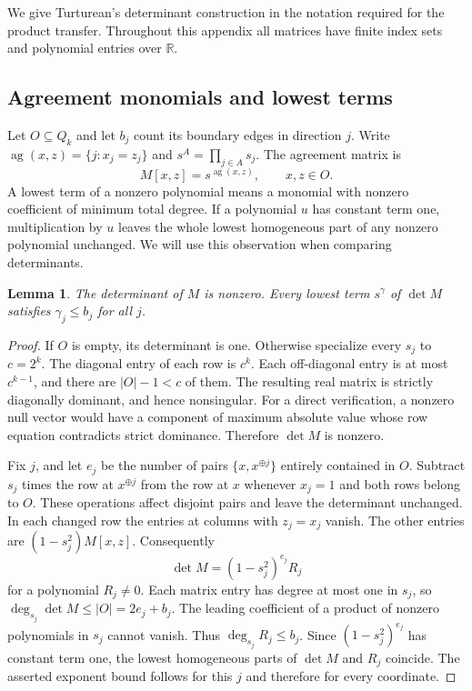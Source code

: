 \documentclass[11pt,reqno]{amsart}
\newtheorem{lemma}[theorem]{Lemma}
\theoremstyle{definition}
\theoremstyle{remark}
\newcommand{\R}{\mathbb R}
\newcommand{\ag}{\operatorname{ag}}
\numberwithin{equation}{section}
\begin{document}
We give Turturean's determinant construction in the notation required
for the product transfer. Throughout this appendix all matrices have
finite index sets and polynomial entries over $\R$.

\subsection{Agreement monomials and lowest terms}

Let $O\subseteq Q_k$ and let $b_j$ count its boundary edges in direction
$j$. Write $\ag(x,z)=\{j:x_j=z_j\}$ and
$s^A=\prod_{j\in A}s_j$. The agreement matrix is
\[
 M[x,z]=s^{\ag(x,z)},\qquad x,z\in O.
\]
A lowest term of a nonzero polynomial means a monomial with nonzero
coefficient of minimum total degree. If a polynomial $u$ has constant
term one, multiplication by $u$ leaves the whole lowest homogeneous
part of any nonzero polynomial unchanged. We will use this observation
when comparing determinants.

\begin{lemma}\label{lem:lowest-det}
The determinant of $M$ is nonzero. Every lowest term $s^\gamma$ of
$\det M$ satisfies $\gamma_j\le b_j$ for all $j$.
\end{lemma}

\begin{proof}
If $O$ is empty, its determinant is one. Otherwise specialize every
$s_j$ to $c=2^k$. The diagonal entry of each row is $c^k$.
Each off-diagonal entry is at most $c^{k-1}$, and there are
$|O|-1<c$ of them. The resulting real matrix is strictly diagonally
dominant, and hence nonsingular. For a direct verification, a nonzero
null vector would have a component of maximum absolute value whose row
equation contradicts strict dominance. Therefore $\det M$ is nonzero.

Fix $j$, and let $e_j$ be the number of pairs $\{x,x^{\oplus j}\}$
entirely contained in $O$. Subtract $s_j$ times the row at
$x^{\oplus j}$ from the row at $x$ whenever $x_j=1$ and both rows
belong to $O$. These operations affect disjoint pairs and leave the
determinant unchanged. In each changed row the entries at columns
with $z_j=x_j$ vanish. The other entries are
$(1-s_j^2)M[x,z]$. Consequently
\[
 \det M=(1-s_j^2)^{e_j}R_j
\]
for a polynomial $R_j\ne0$.
Each matrix entry has degree at most one in $s_j$, so
$\deg_{s_j}\det M\le |O|=2e_j+b_j$.
The leading coefficient of a product of nonzero polynomials in $s_j$
cannot vanish. Thus $\deg_{s_j}R_j\le b_j$.
Since $(1-s_j^2)^{e_j}$ has constant term one, the lowest homogeneous
parts of $\det M$ and $R_j$ coincide. The asserted exponent bound
follows for this $j$ and therefore for every coordinate.
\end{proof}
\end{document}
